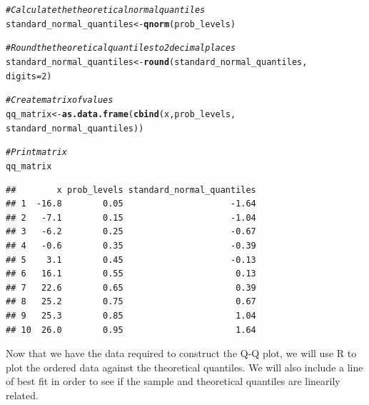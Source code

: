 \documentclass[12pt]{article}\usepackage[]{graphicx}\usepackage[]{color}
\makeatletter
\newcommand{\hlnum}[1]{\textcolor[rgb]{0.686,0.059,0.569}{#1}}%
\newcommand{\hlcom}[1]{\textcolor[rgb]{0.678,0.584,0.686}{\textit{#1}}}%
\newcommand{\hlstd}[1]{\textcolor[rgb]{0.345,0.345,0.345}{#1}}%
\newcommand{\hlkwb}[1]{\textcolor[rgb]{0.69,0.353,0.396}{#1}}%
\newcommand{\hlkwc}[1]{\textcolor[rgb]{0.333,0.667,0.333}{#1}}%
\newcommand{\hlkwd}[1]{\textcolor[rgb]{0.737,0.353,0.396}{\textbf{#1}}}%
\newenvironment{kframe}{%
 \def\at@end@of@kframe{}%
 \ifinner\ifhmode%
  \def\at@end@of@kframe{\end{minipage}}%
  \begin{minipage}{\columnwidth}%
 \fi\fi%
 \def\FrameCommand##1{\hskip\@totalleftmargin \hskip-\fboxsep
 \colorbox{shadecolor}{##1}\hskip-\fboxsep
     \hskip-\linewidth \hskip-\@totalleftmargin \hskip\columnwidth}%
 \MakeFramed {\advance\hsize-\width
   \@totalleftmargin\z@ \linewidth\hsize
   \@setminipage}}%
 {\par\unskip\endMakeFramed%
 \at@end@of@kframe}
\newenvironment{knitrout}{}{} %
\makeatother
\begin{document}
\begin{enumerate}[a)]
\begin{knitrout}
\begin{kframe}
\begin{alltt}
\hlcom{#Calculate the theoretical normal quantiles}
\hlstd{standard_normal_quantiles} \hlkwb{<-} \hlkwd{qnorm}\hlstd{(prob_levels)}

\hlcom{#Round the theoretical quantiles to 2 decimal places}
\hlstd{standard_normal_quantiles} \hlkwb{<-} \hlkwd{round}\hlstd{(standard_normal_quantiles,}
                                   \hlkwc{digits} \hlstd{=} \hlnum{2}\hlstd{)}

\hlcom{#Create matrix of values}
\hlstd{qq_matrix} \hlkwb{<-} \hlkwd{as.data.frame}\hlstd{(}\hlkwd{cbind}\hlstd{(x, prob_levels,}
                                 \hlstd{standard_normal_quantiles))}

\hlcom{#Print matrix}
\hlstd{qq_matrix}
\end{alltt}
\begin{verbatim}
##        x prob_levels standard_normal_quantiles
## 1  -16.8        0.05                     -1.64
## 2   -7.1        0.15                     -1.04
## 3   -6.2        0.25                     -0.67
## 4   -0.6        0.35                     -0.39
## 5    3.1        0.45                     -0.13
## 6   16.1        0.55                      0.13
## 7   22.6        0.65                      0.39
## 8   25.2        0.75                      0.67
## 9   25.3        0.85                      1.04
## 10  26.0        0.95                      1.64
\end{verbatim}
\end{kframe}
\end{knitrout}

Now that we have the data required to construct the Q-Q plot, we will use R to plot the ordered data against the theoretical quantiles. We will also include a line of best fit in order to see if the sample and theoretical quantiles are linearily related.


\end{enumerate}
\end{document}
